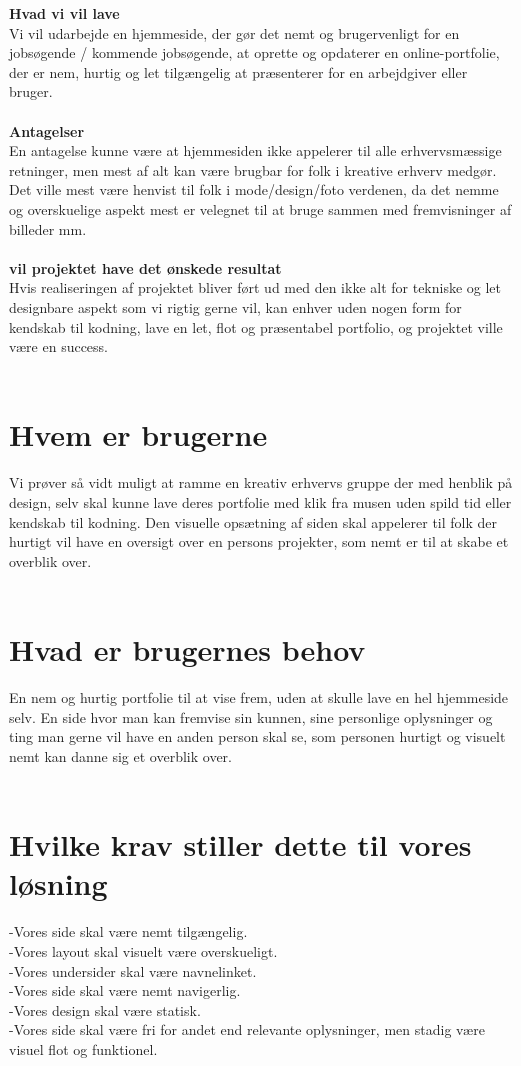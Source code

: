 \documentclass[a4paper,titlepage,fleqn,12pt]{article}
\begin{document}
\textbf{Hvad vi vil lave}\\
Vi vil udarbejde en hjemmeside, der gør det nemt og brugervenligt for en jobsøgende / kommende jobsøgende, at oprette og opdaterer en online-portfolie, der er nem, hurtig og let tilgængelig at præsenterer for en arbejdgiver eller bruger. \\ 
\\
\textbf{Antagelser}\\
En antagelse kunne være at hjemmesiden ikke appelerer til alle erhvervsmæssige retninger, men mest af alt kan være brugbar for folk i kreative erhverv medgør. Det ville mest være henvist til folk i mode/design/foto verdenen, da det nemme og overskuelige aspekt mest er velegnet til at bruge sammen med fremvisninger af billeder mm.\\
\\
\textbf{vil projektet have det ønskede resultat}\\
Hvis realiseringen af projektet bliver ført ud med den ikke alt for tekniske og let designbare aspekt som vi rigtig gerne vil, kan enhver uden nogen form for kendskab til kodning, lave en let, flot og præsentabel portfolio, og projektet ville være en success.\\
\\
\section{Hvem er brugerne}
Vi prøver så vidt muligt at ramme en kreativ erhvervs gruppe der med henblik på design, selv skal kunne lave deres portfolie med klik fra musen uden spild tid eller kendskab til kodning. Den visuelle opsætning af siden skal appelerer til folk der hurtigt vil have en oversigt over en persons projekter, som nemt er til at skabe et overblik over.\\
\\
\section{Hvad er brugernes behov}
En nem og hurtig portfolie til at vise frem, uden at skulle lave en hel hjemmeside selv. En side hvor man kan fremvise sin kunnen, sine personlige oplysninger og ting man gerne vil have en anden person skal se, som personen hurtigt og visuelt nemt kan danne sig et overblik over.\\
\\
\section{Hvilke krav stiller dette til vores løsning}
-Vores side skal være nemt tilgængelig.\\
-Vores layout skal visuelt være overskueligt.\\
-Vores undersider skal være navnelinket.\\
-Vores side skal være nemt navigerlig.\\
-Vores design skal være statisk.\\
-Vores side skal være fri for andet end relevante oplysninger, men stadig være visuel flot og funktionel.\\
\\
\end{document}
